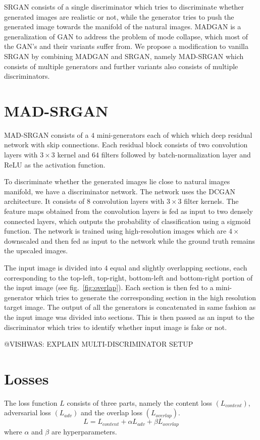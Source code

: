 \documentclass[12pt,a4paper,twocolumn]{article}
\begin{document}
        SRGAN consists of a single discriminator which tries to discriminate whether generated images are realistic or not, while the generator tries to push the generated image towards the manifold of the natural images.
        MADGAN \cite{madgan} is a generalization of GAN to address the problem of mode collapse, which most of the GAN's and their variants suffer from.
        We propose a modification to vanilla SRGAN by combining MADGAN and SRGAN, namely MAD-SRGAN which consists of multiple generators and further variants also consists of multiple discriminators.

    \section{MAD-SRGAN}
        MAD-SRGAN consists of a $4$ mini-generators each of which which deep residual network \cite{resnet} with skip connections.
        Each residual block consists of two convolution layers with $3\times3$ kernel and $64$ filters followed by batch-normalization \cite{batch-norm} layer and ReLU as the activation function.

        To discriminate whether the generated images lie close to natural images manifold, we have a discriminator network.
        The network uses the DCGAN \cite{dcgan} architecture.
        It consists of $8$ convolution layers with $3\times3$ filter kernels.
        The feature maps obtained from the convolution layers is fed as input to two densely connected layers, which outputs the probability of classification using a sigmoid function.
        The network is trained using high-resolution images which are $4\times$ downscaled and then fed as input to the network while the ground truth remains the upscaled images.

        The input image is divided into $4$ equal and slightly overlapping sections, each corresponding to the top-left, top-right, bottom-left and bottom-right portion of the input image (see fig.~\ref{fig:overlap}).
        Each section is then fed to a mini-generator which tries to generate the corresponding section in the high resolution target image.
        The output of all the generators is concatenated in same fashion as the input image was divided into sections.
        This is then passed as an input to the discriminator which tries to identify whether input image is fake or not.

        @VISHWAS: EXPLAIN MULTI-DISCRIMINATOR SETUP

    \section{Losses}
        The loss function $L$ consists of three parts, namely the content loss $(L_{content})$, adversarial loss $(L_{adv})$ and the overlap loss $(L_{overlap})$.\\
            $$L = L_{content} + \alpha L_{adv} + \beta L_{overlap}$$
        where $\alpha$ and $\beta$ are hyperparameters.
\end{document}
